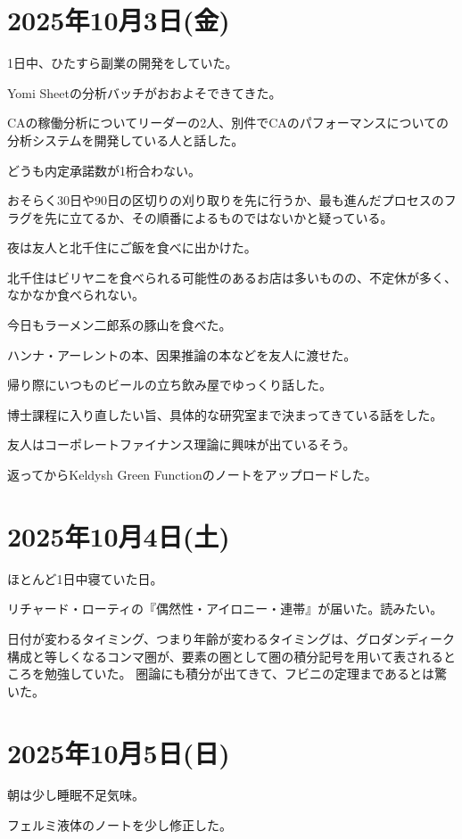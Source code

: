 \documentclass[uplatex]{jsarticle}
\begin{document}
\section{2025年10月3日(金)}

1日中、ひたすら副業の開発をしていた。

Yomi Sheetの分析バッチがおおよそできてきた。

CAの稼働分析についてリーダーの2人、別件でCAのパフォーマンスについての分析システムを開発している人と話した。

どうも内定承諾数が1桁合わない。

おそらく30日や90日の区切りの刈り取りを先に行うか、最も進んだプロセスのフラグを先に立てるか、その順番によるものではないかと疑っている。

夜は友人と北千住にご飯を食べに出かけた。

北千住はビリヤニを食べられる可能性のあるお店は多いものの、不定休が多く、なかなか食べられない。

今日もラーメン二郎系の豚山を食べた。

ハンナ・アーレントの本、因果推論の本などを友人に渡せた。

帰り際にいつものビールの立ち飲み屋でゆっくり話した。

博士課程に入り直したい旨、具体的な研究室まで決まってきている話をした。

友人はコーポレートファイナンス理論に興味が出ているそう。

返ってからKeldysh Green Functionのノートをアップロードした。

\section{2025年10月4日(土)}

ほとんど1日中寝ていた日。

リチャード・ローティの『偶然性・アイロニー・連帯』が届いた。読みたい。

日付が変わるタイミング、つまり年齢が変わるタイミングは、グロダンディーク構成と等しくなるコンマ圏が、要素の圏として圏の積分記号を用いて表されるところを勉強していた。
圏論にも積分が出てきて、フビニの定理まであるとは驚いた。

\section{2025年10月5日(日)}

朝は少し睡眠不足気味。

フェルミ液体のノートを少し修正した。
\end{document}
